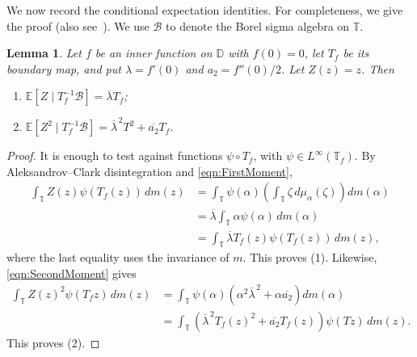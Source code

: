 \documentclass[12pt, reqno, final, a4paper]{amsart}
\theoremstyle{plain}
\newtheorem{lemma}[theorem]{Lemma}
\theoremstyle{definition}
\theoremstyle{remark}
\newcommand{\T}{\mathbb T}
\newcommand{\E}{\mathbb E}
\newcommand{\Borel}{\mathcal B}
\newcommand{\1}{\mathbf 1}
\begin{document}
We now record the conditional expectation identities. For completeness, we give the proof (also see~\cite{ChenFuLinQiu2026}). We use $\mathcal{B}$ to denote the Borel sigma algebra on $\T$.
\begin{lemma}\label{lem:regression}
Let $f$ be an inner function on $\mathbb D$ with $f(0)=0$, let $T_f$ be its
boundary map, and put $\lambda=f'(0)$ and $a_2=f''(0)/2$. Let $Z(z)=z$.
Then
\begin{enumerate}
 \item $\E[Z\mid T_f^{-1}\Borel]=\overline\lambda T_f$;
 \item $\E[Z^2\mid T_f^{-1}\Borel]=\overline\lambda^{\,2}T^2+\overline{a_2}T_f$.
\end{enumerate}
\end{lemma}
\begin{proof}
It is enough to test against functions $\psi\circ T_f$, with
$\psi\in L^\infty(\T_f)$. By Aleksandrov--Clark disintegration and
\eqref{eqn:FirstMoment},
\begin{align*}
 \int_{\T}Z(z)\psi(T_f(z))\,dm(z)
 &=\int_{\T}\psi(\alpha)
   \left(\int_{\T}\zeta\,d\mu_\alpha(\zeta)\right)dm(\alpha)\\
 &=\overline\lambda\int_{\T}\alpha\psi(\alpha)\,dm(\alpha)\\
 &=\int_{\T}\overline\lambda T_f(z)\psi(T_f(z))\,dm(z),
\end{align*}
where the last equality uses the invariance of $m$. This proves (1).
Likewise, \eqref{eqn:SecondMoment} gives
\begin{align*}
 \int_{\T}Z(z)^2\psi(T_fz)\,dm(z)
 &=\int_{\T}\psi(\alpha)
   \left(\alpha^2\overline\lambda^{\,2}
         +\alpha\overline{a_2}\right)dm(\alpha)\\
 &=\int_{\T}
   \left(\overline\lambda^{\,2}T_f(z)^2+\overline{a_2}T_f(z)\right)
   \psi(Tz)\,dm(z).
\end{align*}
This proves (2).
\end{proof}




   
\end{document}

